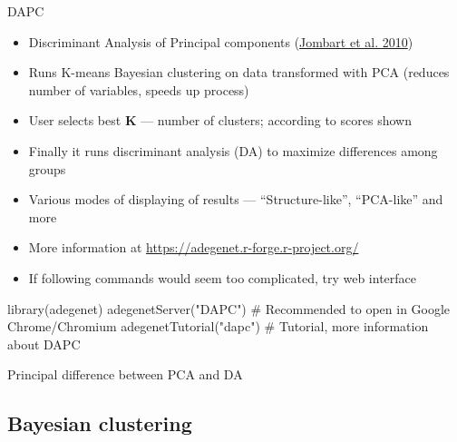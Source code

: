 \documentclass[compress, xelatex, 11pt, xcolor=svgnames, aspectratio=169,
	hyperref={
		bookmarks=true,
		unicode=true,
		colorlinks=true,
		pdftitle={Molecular data in R},
		plainpages=false,
		pdfauthor={Vojtech Zeisek},
		pdfsubject={Course about phylogeny and evolution in R},
		pdfcreator={XeLaTeX},
		pdfkeywords={R, evolution, phylogeny, molecular data},
		linkcolor=Crimson, %
		anchorcolor=Magenta, %
		citecolor=Magenta, %
		filecolor=Magenta, %
		menucolor=Magenta, %
		urlcolor=DodgerBlue, %
		},
	url={hyphens, lowtilde} %
	]{beamer}
\renewcommand{\texttt}[1]{\colorbox{Beige}{{\ttfamily #1}}}
\begin{document}
\begin{frame}[fragile]{DAPC}
	\label{DAPC}
	\begin{itemize}
		\item Discriminant Analysis of Principal components (\href{https://bmcgenet.biomedcentral.com/articles/10.1186/1471-2156-11-94}{Jombart et al. 2010})
		\item Runs K-means Bayesian clustering on data transformed with PCA (reduces number of variables, speeds up process)
		\item User selects best \textbf{K} --- number of clusters; according to scores shown
		\item Finally it runs discriminant analysis (DA) to maximize differences among groups
		\item Various modes of displaying of results --- \enquote{Structure-like}, \enquote{PCA-like} and more
		\item More information at \url{https://adegenet.r-forge.r-project.org/}
		\item If following commands would seem too complicated, try web interface
	\end{itemize}
	\begin{spluscode}
    library(adegenet)
    adegenetServer("DAPC") # Recommended to open in Google Chrome/Chromium
    adegenetTutorial("dapc") # Tutorial, more information about DAPC
	\end{spluscode}
\end{frame}

\begin{frame}{Principal difference between PCA and DA}
	\begin{center}
		\texttt{[image: dapc-da-pca.png]}
	\end{center}
\end{frame}

\subsection{Bayesian clustering}
\end{document}
